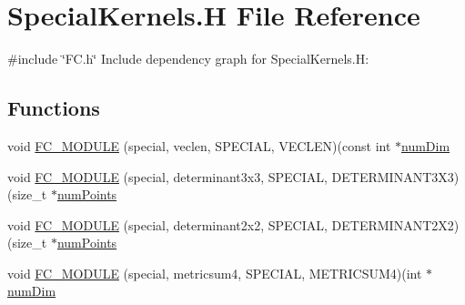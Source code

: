 \hypertarget{SpecialKernels_8H}{}\section{Special\+Kernels.\+H File Reference}
\label{SpecialKernels_8H}
{\ttfamily \#include \char`\"{}F\+C.\+h\char`\"{}}\newline
Include dependency graph for Special\+Kernels.\+H\+:
\subsection*{Functions}
\begin{DoxyCompactItemize}
\item 
void \hyperlink{SpecialKernels_8H_a54e5444b63823301c4a65fd23d20676f}{F\+C\+\_\+\+M\+O\+D\+U\+LE} (special, veclen, S\+P\+E\+C\+I\+AL, V\+E\+C\+L\+EN)(const int $\ast$\hyperlink{SATKernels_8H_a680185db8546de161968dabace9e94f1}{num\+Dim}
\item 
void \hyperlink{SpecialKernels_8H_a3ea21f4744cf074f90c430b90c4ad2a1}{F\+C\+\_\+\+M\+O\+D\+U\+LE} (special, determinant3x3, S\+P\+E\+C\+I\+AL, D\+E\+T\+E\+R\+M\+I\+N\+A\+N\+T3\+X3)(size\+\_\+t $\ast$\hyperlink{ViscidKernels_8H_adf0bf75d0875d1bb42a5348bee7b7bfd}{num\+Points}
\item 
void \hyperlink{SpecialKernels_8H_a002d7021c6aa674ac4130544ba0824c0}{F\+C\+\_\+\+M\+O\+D\+U\+LE} (special, determinant2x2, S\+P\+E\+C\+I\+AL, D\+E\+T\+E\+R\+M\+I\+N\+A\+N\+T2\+X2)(size\+\_\+t $\ast$\hyperlink{ViscidKernels_8H_adf0bf75d0875d1bb42a5348bee7b7bfd}{num\+Points}
\item 
void \hyperlink{SpecialKernels_8H_aec2fc1c0b85dd43bbf27b26b82e172ad}{F\+C\+\_\+\+M\+O\+D\+U\+LE} (special, metricsum4, S\+P\+E\+C\+I\+AL, M\+E\+T\+R\+I\+C\+S\+U\+M4)(int $\ast$\hyperlink{SATKernels_8H_a680185db8546de161968dabace9e94f1}{num\+Dim}
\end{DoxyCompactItemize}
